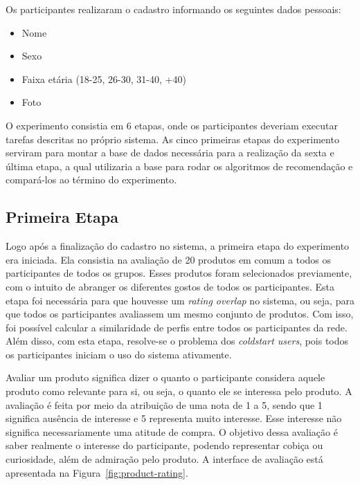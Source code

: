 Os participantes realizaram o cadastro informando os seguintes dados pessoais:

\begin{itemize}
  \item Nome
  \item Sexo
  \item Faixa etária (18-25, 26-30, 31-40, +40)
  \item Foto
\end{itemize}

O experimento consistia em 6 etapas, onde os participantes deveriam executar tarefas descritas no próprio sistema. As cinco primeiras etapas do experimento serviram para montar a base de dados necessária para a realização da sexta e última etapa, a qual utilizaria a base para rodar os algoritmos de recomendação e compará-los ao término do experimento.

\subsection{Primeira Etapa}
\label{cha:primeira_etapa}

Logo após a finalização do cadastro no sistema, a primeira etapa do experimento era iniciada. Ela consistia na avaliação de 20 produtos em comum a todos os participantes de todos os grupos. Esses produtos foram selecionados previamente, com o intuito de abranger os diferentes gostos de todos os participantes. Esta etapa foi necessária para que houvesse um \textit{rating overlap} no sistema, ou seja, para que todos os participantes avaliassem um mesmo conjunto de produtos. Com isso, foi possível calcular a similaridade de perfis entre todos os participantes da rede. Além disso, com esta etapa, resolve-se o problema dos \textit{coldstart users}, pois todos os participantes iniciam o uso do sistema ativamente.

Avaliar um produto significa dizer o quanto o participante considera aquele produto como relevante para si, ou seja, o quanto ele se interessa pelo produto. A avaliação é feita por meio da atribuição de uma nota de 1 a 5, sendo que 1 significa ausência de interesse e 5 representa muito interesse. Esse interesse não significa necessariamente uma atitude de compra. O objetivo dessa avaliação é saber realmente o interesse do participante, podendo representar cobiça ou curiosidade, além de admiração pelo produto. A interface de avaliação está apresentada na Figura~\ref{fig:product-rating}.

